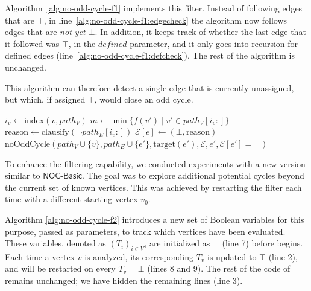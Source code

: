 \documentclass[a4paper,UKenglish,cleveref, autoref, thm-restate, anonymous]{lipics-v2021}
\begin{document}
Algorithm~\ref{alg:no-odd-cycle-f1} implements this filter. Instead of following edges that are $\top$, in line~\ref{alg:no-odd-cycle-f1:edgecheck} the algorithm now follows edges that are \textit{not yet $\bot$}. In addition, it keeps track of whether the last edge that it followed was $\top$, in the $\textit{defined}$ parameter, and it only goes into recursion for defined edges (line~\ref{alg:no-odd-cycle-f1:defcheck}). The rest of the algorithm is unchanged.

This algorithm can therefore detect a single edge that is currently unassigned, but which, if assigned $\top$, would close an odd cycle.

\begin{algorithm}
    \caption{Implementation of \noc as filter ($\mathsf{Basic}$)}
    \small
    \begin{algorithmic}[1]
            \State $i_v \gets \text{index}(v, path_V)$
            \State $m \gets \min\{f(v') \mid v' \in path_V[i_v:]\}$
                \State $\text{reason} \gets \text{clausify}(\neg path_E[i_v:])$
                \State $\mathcal{E}[e] \gets (\bot, \text{reason})$
            \EndIf
        \Else 
             \label{alg:no-odd-cycle-f1:defcheck}
                 \label{alg:no-odd-cycle-f1:edgecheck}
                    \State $\text{noOddCycle}(path_V \cup \{v\}, path_E \cup \{e'\}, \text{target}(e'), \mathcal{E}, e', \mathcal{E}[e'] = \top)$
                \EndFor
            \EndIf        
        \EndIf
    \EndFunction
    \end{algorithmic}
    \label{alg:no-odd-cycle-f1}
\end{algorithm}



To enhance the filtering capability, we conducted experiments with a new version similar to $\mathsf{NOC\textit{-}Basic}$. The goal was to explore additional potential cycles beyond the current set of known vertices. This was achieved by restarting the filter each time with a different starting vertex $v_0$. 

Algorithm \ref{alg:no-odd-cycle-f2} introduces a new set of Boolean variables for this purpose, passed as parameters, to track which vertices have been evaluated. These variables, denoted as $(T_i)_{i \in V}$, are initialized as $\bot$ (line 7) before \noc begins. Each time a vertex $v$ is analyzed, its corresponding $T_v$ is updated to $\top$ (line 2), and \noc will be restarted on every $T_v = \bot$ (lines 8 and 9).  The rest of the code of \noc remains unchanged; we have hidden the remaining lines (line 3).
\end{document}
